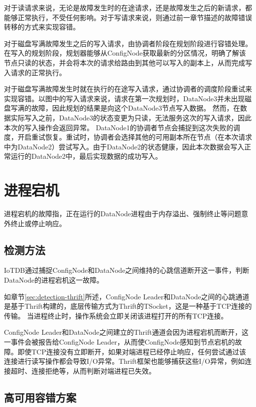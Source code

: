 对于读请求来说，无论是故障发生时的在途请求，还是故障发生之后的新请求，都能够正常执行，不受任何影响。对于写请求来说，则通过前一章节描述的故障错误转移的方式来实现容错。

对于磁盘写满故障发生之后的写入请求，由协调者阶段在规划阶段进行容错处理。
在写入的规划阶段，规划器能够从ConfigNode获取最新的分区情况，明确了解该节点只读的状态，并会将本次的请求给路由到其他可以写入的副本上，从而完成写入请求的正常执行。

对于磁盘写满故障发生时就在执行的在途写入请求，通过协调者的调度阶段重试来实现容错。以图中的写入请求来说，请求在第一次规划时，DataNode3并未出现磁盘写满的故障，因此规划的结果是向这个DataNode3节点写入数据。
然而，在数据实际写入之前，DataNode3的状态变更为只读，无法服务这次的写入请求，因此本次的写入操作会返回异常。
DataNode1的协调者节点会捕捉到这次失败的调度，开启重试恢复。重试时，协调者会选择其他的可用副本所在节点（在本次请求中为DataNode2）尝试写入。由于DataNode2的状态健康，因此本次数据会写入正常运行的DataNode2中，最后实现数据的成功写入。


\section{进程宕机}

进程宕机的故障指，正在运行的DataNode进程由于内存溢出、强制终止等问题意外终止或停止响应。

\subsection{检测方法}

IoTDB通过捕捉ConfigNode和DataNode之间维持的心跳信道断开这一事件，判断DataNode的进程宕机这一故障。

如章节\ref{sec:detection-thrift}所述，ConfigNode Leader和DataNode之间的心跳通道是基于Thrift构建的，底层传输方式为Thrift的TSocket，这是一种基于TCP连接的传输。
当进程终止时，操作系统会立即关闭该进程打开的所有TCP连接。

ConfigNode Leader和DataNode之间建立的Thrift通道会因为进程宕机而断开，这一事件会被报告给ConfigNode Leader，从而使ConfigNode感知到节点宕机的故障。即使TCP连接没有立即断开，如果对端进程已经停止响应，任何尝试通过该连接进行读写操作都会导致I/O异常。Thrift框架也能够捕获这些I/O异常，例如连接超时、连接拒绝等，从而判断对端进程已失效。


\subsection{高可用容错方案}

